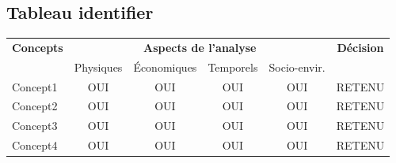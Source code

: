 

\subsection{Tableau identifier}
\label{s:archiver_tableau}

\begin{table}[]
	\begin{tabular}{|l|c|c|c|c|c|}
		\hline
		\multicolumn{1}{|c|}{\multirow{2}{*}{\textbf{Concepts}}} & \multicolumn{4}{c|}{\textbf{Aspects de l'analyse}} & \multirow{2}{*}{\textbf{Décision}} \\ \cline{2-5}
		\multicolumn{1}{|c|}{}                                   & Physiques & Économiques & Temporels & Socio-envir. &                                    \\ \hline
		Concept1                                                 & OUI       & OUI         & OUI       & OUI          & RETENU                             \\ \hline
		Concept2                                                 & OUI       & OUI         & OUI       & OUI          & RETENU                             \\ \hline
		Concept3                                                 & OUI       & OUI         & OUI       & OUI          & RETENU                             \\ \hline
		Concept4                                                 & OUI       & OUI         & OUI       & OUI          & RETENU	        \\ \hline
	\end{tabular}
\end{table}
